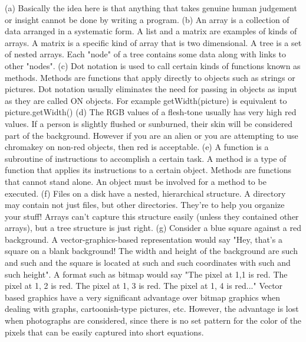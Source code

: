 \begin{exercises}
\begin{ex} %
(a)	Basically the idea here is that anything that takes genuine human
judgement or insight cannot be done by writing a program.\newline
(b)	An array is a collection of data arranged in a systematic form. A
list and a matrix are examples of kinds of arrays. A matrix is a specific
kind of array that is two dimensional. A tree is a set of nested arrays.
Each "node" of a tree contains some data along with links to other "nodes".
\newline
(c)	Dot notation is used to call certain kinds of functions known as
methods. Methods are functions that apply directly to objects such as
strings or pictures. Dot notation usually eliminates the need for passing
in objects as input as they are called ON objects. For example
getWidth(picture) is equivalent to picture.getWidth()
\newline
(d)	The RGB values of a flesh-tone usually has very high red values. If
a person is slightly flushed or sunburned, their skin will be considered
part of the background. However if you are an alien or you are attempting
to use chromakey on non-red objects, then red is acceptable.
\newline
(e)	A function is a subroutine of instructions to accomplish a certain
task. A method is a type of function that applies its instructions to a
certain object. Methods are functions that cannot stand alone. An object
must be involved for a method to be executed.
\newline
(f) Files on a disk have a nested, hierarchical structure. A directory may
contain not just files, but other directories. They're to help you organize
your stuff! Arrays can't capture this structure easily (unless they
contained other arrays), but a tree structure is just right.
\newline
(g)	Consider a blue square against a red background. A
vector-graphics-based representation would say "Hey, that's a square on a
blank background! The width and height of the background are such and such
and the square is located at such and such coordinates with such and such
height". A format such as bitmap would say "The pixel at 1,1 is red. The
pixel at 1, 2 is red. The pixel at 1, 3 is red. The pixel at 1, 4 is
red..." Vector based graphics have a very significant advantage over bitmap
graphics when dealing with graphs, cartoonish-type pictures, etc. However,
the advantage is lost when photographs are considered, since there is no
set pattern for the color of the pixels that can be easily captured into
short equations.
\end{ex}


\end{exercises}
